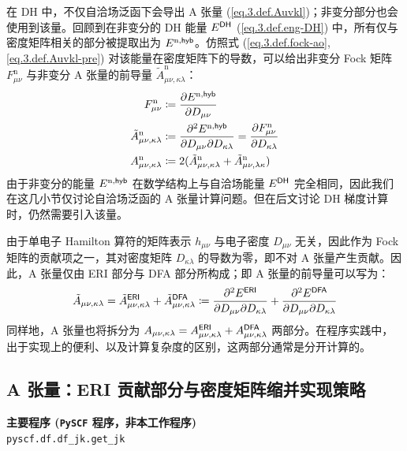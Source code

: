 在 DH 中，不仅自洽场泛函下会导出 A 张量 (\ref{eq.3.def.Auvkl})；非变分部分也会使用到该量。回顾到在非变分的 DH 能量 $E^{\textsf{DH}}$ (\ref{eq.3.def.eng-DH}) 中，所有仅与密度矩阵相关的部分被提取出为 $E^{\mathrm{n}, \textsf{hyb}}$。仿照式 (\ref{eq.3.def.fock-ao}, \ref{eq.3.def.Auvkl-pre}) 对该能量在密度矩阵下的导数，可以给出非变分 Fock 矩阵 $F_{\mu \nu}^\mathrm{n}$ 与非变分 A 张量的前导量 $\tilde A_{\mu \nu, \kappa \lambda}^\mathrm{n}$：
\begin{align}
    F_{\mu \nu}^\mathrm{n} &\coloneq \frac{\partial E^{\mathrm{n}, \textsf{hyb}}}{\partial D_{\mu \nu}} \\
    \tilde A_{\mu \nu, \kappa \lambda}^\mathrm{n} &\coloneq \frac{\partial^2 E^{\mathrm{n}, \textsf{hyb}}}{\partial D_{\mu \nu} \partial D_{\kappa \lambda}} = \frac{\partial F_{\mu \nu}^\mathrm{n}}{\partial D_{\kappa \lambda}} \\
    A_{\mu \nu, \kappa \lambda}^\mathrm{n} &\coloneq 2 (\tilde A_{\mu \nu, \kappa \lambda}^\mathrm{n} + \tilde A_{\mu \nu, \lambda \kappa}^\mathrm{n})
\end{align}
由于非变分的能量 $E^{\mathrm{n}, \textsf{hyb}}$ 在数学结构上与自洽场能量 $E^{\textsf{DH}}$ 完全相同，因此我们在这几小节仅讨论自洽场泛函的 A 张量计算问题。但在后文讨论 DH 梯度计算时，仍然需要引入该量。

由于单电子 Hamilton 算符的矩阵表示 $h_{\mu \nu}$ 与电子密度 $D_{\mu \nu}$ 无关，因此作为 Fock 矩阵的贡献项之一，其对密度矩阵 $D_{\kappa \lambda}$ 的导数为零，即不对 A 张量产生贡献。因此，A 张量仅由 ERI 部分与 DFA 部分所构成；即 A 张量的前导量可以写为：
\begin{equation}
    \tilde A_{\mu \nu, \kappa \lambda} = \tilde A_{\mu \nu, \kappa \lambda}^{\textsf{ERI}} + \tilde A_{\mu \nu, \kappa \lambda}^{\textsf{DFA}} \coloneq \frac{\partial^2 E^{\textsf{ERI}}}{\partial D_{\mu \nu} \partial D_{\kappa \lambda}} + \frac{\partial^2 E^{\textsf{DFA}}}{\partial D_{\mu \nu} \partial D_{\kappa \lambda}}
\end{equation}
同样地，A 张量也将拆分为 $A_{\mu \nu, \kappa \lambda} = A_{\mu \nu, \kappa \lambda}^{\textsf{ERI}} + A_{\mu \nu, \kappa \lambda}^{\textsf{DFA}}$ 两部分。在程序实践中，出于实现上的便利、以及计算复杂度的区别，这两部分通常是分开计算的。

\subsection{A 张量：ERI 贡献部分与密度矩阵缩并实现策略}

\begin{tcolorbox}
    \textbf{主要程序 (\texttt{PySCF} 程序，非本工作程序)}\\
    \verb|pyscf.df.df_jk.get_jk|
\end{tcolorbox}

